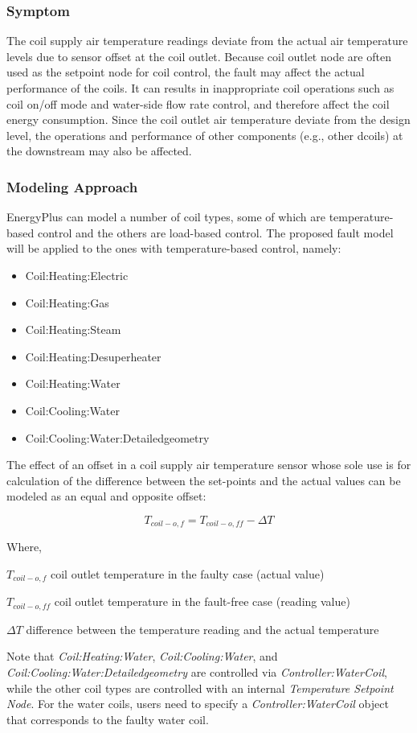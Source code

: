 \subsubsection{Symptom}

The coil supply air temperature readings deviate from the actual air temperature levels due to sensor offset at the coil outlet. Because coil outlet node are often used as the setpoint node for coil control, the fault may affect the actual performance of the coils. It can results in inappropriate coil operations such as coil on/off mode and water-side flow rate control, and therefore affect the coil energy consumption. Since the coil outlet air temperature deviate from the design level, the operations and performance of other components (e.g., other dcoils) at the downstream may also be affected.

\subsubsection{Modeling Approach}

EnergyPlus can model a number of coil types, some of which are temperature-based control and the others are load-based control. The proposed fault model will be applied to the ones with temperature-based control, namely:

\begin{itemize}
\tightlist
\item
  Coil:Heating:Electric
\item
  Coil:Heating:Gas
\item
  Coil:Heating:Steam
\item
  Coil:Heating:Desuperheater
\item
  Coil:Heating:Water
\item
  Coil:Cooling:Water
\item
  Coil:Cooling:Water:Detailedgeometry
\end{itemize}

The effect of an offset in a coil supply air temperature sensor whose sole use is for calculation of the difference between the set-points and the actual values can be modeled as an equal and opposite offset:

\begin{equation}
T_{coil-o,f} = T_{coil-o,ff} - \Delta T
\end{equation}

Where,

\(T_{coil-o,f}\) coil outlet temperature in the faulty case (actual value)

\(T_{coil-o,ff}\) coil outlet temperature in the fault-free case (reading value)

\(\Delta T\) difference between the temperature reading and the actual temperature

Note that \emph{Coil:Heating:Water}, \emph{Coil:Cooling:Water}, and \emph{Coil:Cooling:Water:Detailedgeometry} are controlled via \emph{Controller:WaterCoil}, while the other coil types are controlled with an internal \emph{Temperature Setpoint Node}. For the water coils, users need to specify a \emph{Controller:WaterCoil} object that corresponds to the faulty water coil.

